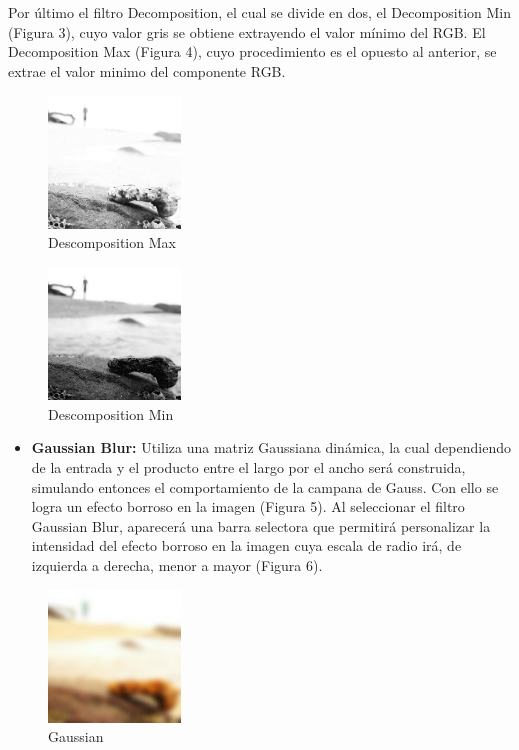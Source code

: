 \documentclass[journal]{IEEEtran}
\begin{document}
	\newpage
	Por último el filtro Decomposition, el cual se divide en dos, el Decomposition Min (Figura 3), cuyo valor gris se obtiene extrayendo el valor mínimo del RGB. El Decomposition Max (Figura 4), cuyo procedimiento es el opuesto al anterior, se extrae el valor minimo del componente RGB.
	
	\begin{figure}[h]
		\centering
		\includegraphics[width = 100pt]{desc-max.jpeg}
		\caption{Descomposition Max}
	\end{figure}


	\begin{figure}[h]
		\centering
		\includegraphics[width = 100pt]{desc-min.jpeg}
		\caption{Descomposition Min}
	\end{figure}

	
		
	
	\begin{itemize}
		\item{\bf Gaussian Blur:} Utiliza una matriz Gaussiana dinámica, la cual dependiendo de la entrada y el producto entre el largo por el ancho será construida, simulando entonces el comportamiento de la campana de Gauss. Con ello se logra un efecto borroso en la imagen (Figura 5).  Al seleccionar el filtro Gaussian Blur, aparecerá una barra selectora que permitirá personalizar la intensidad del efecto borroso en la imagen cuya escala de radio irá, de izquierda a derecha, menor a mayor (Figura 6). 
	\end{itemize}

	\begin{figure}[h]
		\centering
		\includegraphics[width = 100pt]{gauss.jpeg}
		\caption{Gaussian}
	\end{figure}
\end{document}
